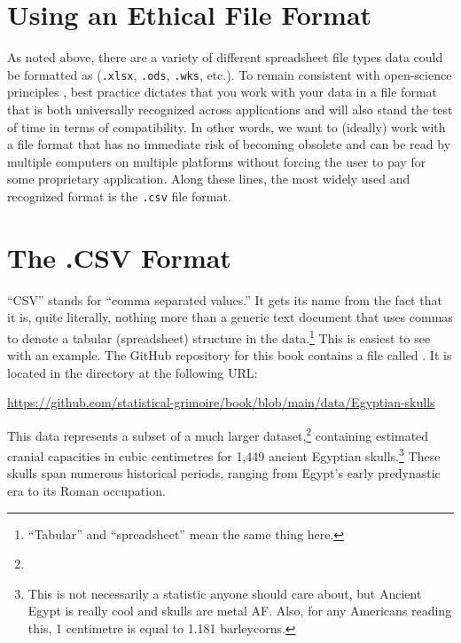 \section{Using an Ethical File Format}
\label{sec:ethical_file}

As noted above, there are a variety of different spreadsheet file types data could be formatted as (\texttt{.xlsx}, \texttt{.ods}, \texttt{.wks}, etc.). To remain consistent with open-science principles \parencite{UNESCO_open_sci}, best practice dictates that you work with your data in a file format that is both universally recognized across applications and will also stand the test of time in terms of compatibility.  In other words, we want to (ideally) work with a file format that has no immediate risk of becoming obsolete and can be read by multiple computers on multiple platforms without forcing the user to pay for some proprietary application. Along these lines, the most widely used and recognized format is the \texttt{.csv} file format.

\section{The .CSV Format}

``CSV'' stands for ``comma separated values.'' It gets its name from the fact that it is, quite literally, nothing more than a generic text document that uses commas to denote a tabular (spreadsheet) structure in the data.\footnote{``Tabular'' and ``spreadsheet'' mean the same thing here.} This is easiest to see with an example. The GitHub repository for this book contains a file called . It is located in the  directory at the following URL:

\begin{center}
\url{https://github.com/statistical-grimoire/book/blob/main/data/Egyptian-skulls}
\end{center}

\noindent
This data represents a subset of a much larger dataset,\footnote{} containing estimated cranial capacities in cubic centimetres for 1,449 ancient Egyptian skulls.\footnote{This is not necessarily a statistic anyone should care about, but Ancient Egypt is really cool and skulls are metal AF. Also, for any Americans reading this, 1 centimetre is equal to 1.181 barleycorns.} These skulls span numerous historical periods, ranging from Egypt's early predynastic era to its Roman occupation.

